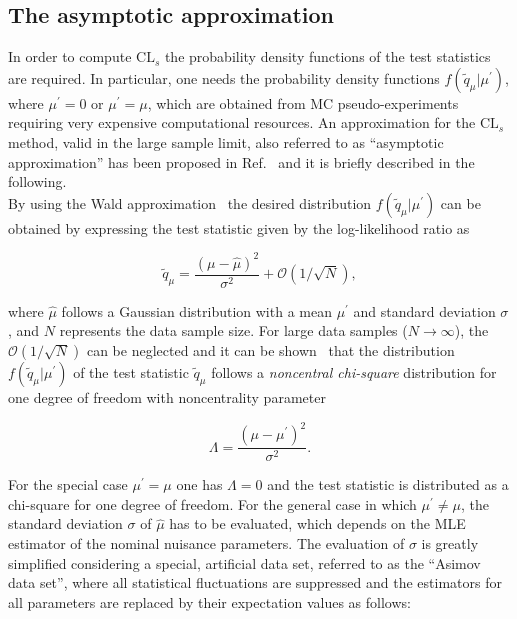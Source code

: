 \subsection{The asymptotic approximation}\label{subsec:AsymptCLs}

In order to compute $\mathrm{CL}_s$ the probability density functions of the test statistics are required.
In particular, one needs the probability density functions $f(\tilde{q}_\mu|\mu^\prime)$, where $\mu^\prime = 0$ or $\mu^\prime = \mu$,
which are obtained from MC pseudo-experiments requiring very expensive computational resources.
An approximation for the $\mathrm{CL}_s$ method, valid in the large sample limit, also referred to as ``asymptotic approximation'' has been proposed in Ref.~\cite{AsymptCLs}
and it is briefly described in the following.\\

By using the Wald approximation~\cite{10.2307/1990256} the desired distribution $f(\tilde{q}_\mu|\mu^\prime)$ can be obtained by expressing the test statistic given by the log-likelihood ratio as

\begin{equation}
\tilde{q}_\mu = \frac{(\mu-\hat{\mu})^2}{\sigma^2} + \mathcal{O}(1/\sqrt{N}),
\end{equation}

where $\hat{\mu}$ follows a Gaussian distribution with a mean $\mu^\prime$ and standard deviation $\sigma$, and $N$ represents the data sample size.
For large data samples ($N\rightarrow\infty$), the $\mathcal{O}(1/\sqrt{N})$ can be neglected and it can be shown~\cite{wilks1938} that the distribution $f(\tilde{q}_\mu|\mu^\prime)$ of the test statistic $\tilde{q}_\mu$
follows a \textit{noncentral chi-square} distribution for one degree of freedom with noncentrality parameter

\begin{equation}
\Lambda = \frac{(\mu-\mu^\prime)^2}{\sigma^2}.
\end{equation}

For the special case $\mu^\prime = \mu$ one has $\Lambda = 0$ and the test statistic is distributed as a chi-square for one degree of freedom.
For the general case in which $\mu^\prime \neq \mu$, the standard deviation $\sigma$ of $\hat{\mu}$ has to be evaluated, which depends on the MLE estimator of the nominal nuisance parameters.
The evaluation of $\sigma$ is greatly simplified considering a special, artificial data set, referred to as the ``Asimov data set'', where all statistical fluctuations are suppressed and the estimators for all parameters
are replaced by their expectation values as follows:

